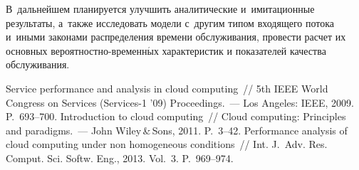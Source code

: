 \begin{multicols}{2}
  В~дальнейшем планируется улучшить аналитические и~имитационные 
результаты, а~также исследовать модели с~другим типом входящего потока 
и~иными законами распределения времени обслуживания, провести расчет их 
основных ве\-ро\-ят\-но\-ст\-но-вре\-мен\-н$\acute{\mbox{ы}}$х характеристик 
и показателей качества обслуживания.

{\small\frenchspacing
 {%
 \begin{thebibliography}{99}
 Service performance and analysis in cloud computing~// 
5th IEEE World Congress on Services (Services-1 '09) Proceedings.~--- Los 
Angeles: IEEE, 2009. P.~693--700.
 Introduction to cloud computing~// Cloud 
computing: Principles and paradigms.~--- John Wiley\,\&\,Sons, 2011. P.~3--42.
Performance analysis of cloud computing under non homogeneous conditions~// 
Int. J.~Adv. Res. Comput. Sci. Softw. Eng., 2013. Vol.~3. P.~969--974.


\end{thebibliography}}}
\end{multicols}
